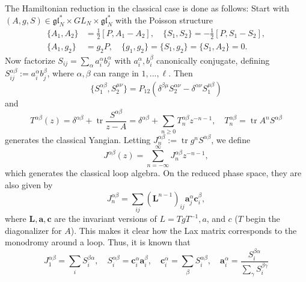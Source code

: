 \documentclass[11pt]{report}
\theoremstyle{definition}
\theoremstyle{remark}
\theoremstyle{remark}
\begin{document}
The Hamiltonian reduction in the classical case is done as follows: Start with $(A,g,S) \in \mathfrak{gl}_N^* \times GL_N \times \mathfrak{gl}_N^*$ with the Poisson structure
\begin{align*}
\{ A_1,A_2 \} &= \tfrac{1}{2} [P,A_1-A_2], \quad
\{ S_1,S_2 \} = -\tfrac{1}{2} [P,S_1-S_2], \\
\{ A_1,g_2 \} &= g_2 P, \quad \{ g_1,g_2 \} = \{ S_1,g_2 \} = \{ S_1,A_2 \} = 0.
\end{align*}
Now factorize $S_{ij} = \sum_\alpha a_i^\alpha b_j^\alpha$ with $a_i^\alpha,b_i^\beta$ canonically conjugate, defining $S_{ij}^{\alpha\beta} := a_i^\alpha b_j^\beta$, where $\alpha,\beta$ can range in $1,...,\ell$. Then
\begin{equation*}
\{ S_1^{\alpha\beta},S_2^{\mu\nu} \} = P_{12} (\delta^{\beta\mu} S_2^{\alpha\nu} - \delta^{\alpha\nu} S_1^{\mu\beta})
\end{equation*}
and
\begin{equation*}
T^{\alpha\beta}(z) = \delta^{\alpha\beta} + \operatorname{tr} \frac{S^{\alpha\beta}}{z-A} = \delta^{\alpha\beta}+\sum_{n\geq 0} T_n^{\alpha\beta} z^{-n-1}, \quad T_n^{\alpha\beta} = \operatorname{tr} A^n S^{\alpha \beta}
\end{equation*}
generates the classical Yangian. Letting $J_n^{\alpha\beta} := \operatorname{tr} g^n S^{\alpha \beta}$, we define
\begin{equation*}
J^{\alpha \beta}(z) = \sum_{n=-\infty}^\infty J_n^{\alpha \beta} z^{-n-1},
\end{equation*}
which generates the classical loop algebra. On the reduced phase space, they are also given by
\begin{equation*}
J_n^{\alpha\beta} = \sum_{ij} (\mathbf{L}^{n-1})_{ij} \mathbf{a}_j^\alpha \mathbf{c}_i^\beta,
\end{equation*}
where $\mathbf{L},\mathbf{a},\mathbf{c}$ are the invariant versions of $L = TgT^{-1},a$, and $c$ ($T$ begin the diagonalizer for $A$). This makes it clear how the Lax matrix corresponds to the monodromy around a loop. Thus, it is known that
\begin{equation*}
J_1^{\alpha\beta} = \sum_i S_i^{\beta\alpha}, \quad S_i^{\alpha\beta} = \mathbf{c}_i^\alpha \mathbf{a}_i^\beta, \quad \mathbf{c}_i^\alpha = \sum_\beta S_i^{\alpha\beta}, \quad \mathbf{a}_i^\alpha = \frac{S_i^{\beta\alpha}}{\sum_\gamma S_i^{\beta\gamma}}
\end{equation*}
\end{document}
